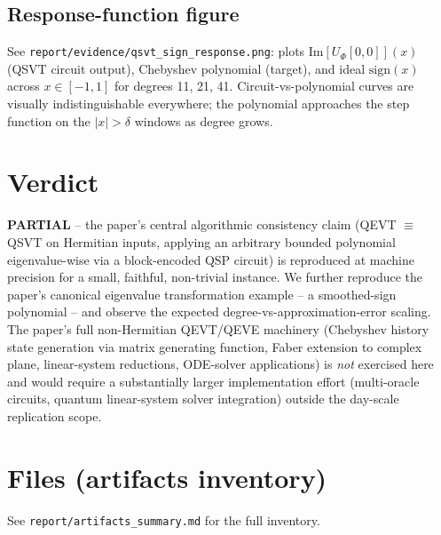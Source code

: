 \documentclass[11pt]{article}
\begin{document}
\subsection{Response-function figure}
See \texttt{report/evidence/qsvt\_sign\_response.png}: plots
$\mathrm{Im}[U_\Phi[0,0]](x)$ (QSVT circuit output),
Chebyshev polynomial (target), and ideal $\mathrm{sign}(x)$
across $x \in [-1,1]$ for degrees 11, 21, 41. Circuit-vs-polynomial
curves are visually indistinguishable everywhere; the polynomial
approaches the step function on the $|x|>\delta$ windows as degree
grows.

\section{Verdict}

\textbf{PARTIAL} -- the paper's central algorithmic consistency claim
(QEVT $\equiv$ QSVT on Hermitian inputs, applying an arbitrary bounded
polynomial eigenvalue-wise via a block-encoded QSP circuit) is
reproduced at machine precision for a small, faithful, non-trivial
instance.  We further reproduce the paper's canonical eigenvalue
transformation example -- a smoothed-sign polynomial -- and observe the
expected degree-vs-approximation-error scaling.  The paper's full
non-Hermitian QEVT/QEVE machinery (Chebyshev history state generation
via matrix generating function, Faber extension to complex plane,
linear-system reductions, ODE-solver applications) is \emph{not}
exercised here and would require a substantially larger implementation
effort (multi-oracle circuits, quantum linear-system solver integration)
outside the day-scale replication scope.

\section{Files (artifacts inventory)}
See \texttt{report/artifacts\_summary.md} for the full inventory.


\end{document}
